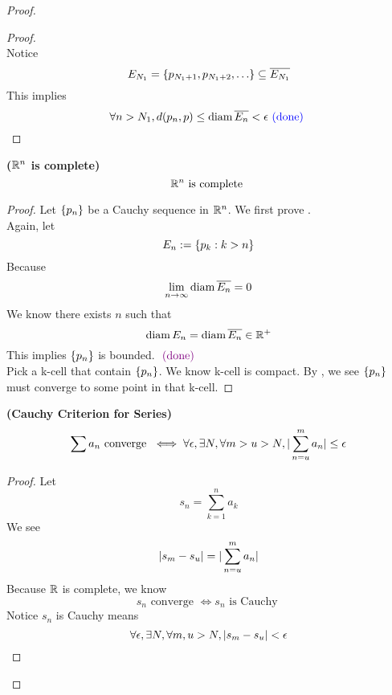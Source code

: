 \documentclass{report}
\begin{document}
\begin{proof}
\begin{proof}
\begin{equation}
\end{equation}
Notice
\begin{equation}
E_{N_1}=\set{p_{N_1+1},p_{N_1+2},\dots }\subseteq \overline{E_{N_1}}
\end{equation}
This implies 
\begin{equation}
\forall n>N_1, d(p_n,p)\leq \text{diam}\, \overline{E_n}<\epsilon \textcolor{blue}{\text{ (done) }}
\end{equation}
\end{proof}
\begin{corollary}
\label{3.9.9}
\textbf{($\mathbb{R}^n$ is complete)}
\begin{equation}
\mathbb{R}^n\text{ is complete }
\end{equation}
\end{corollary}
\begin{proof}
Let $\{ p_n \}$ be a Cauchy sequence in $\mathbb{R}^n$. We first prove .\\

Again, let
\begin{equation}
E_n:=\{ p_k:k>n \}
\end{equation}
Because 
\begin{equation}
\lim_{n\to\infty}\text{diam}\, \overline{E_n}=0
\end{equation}
We know there exists $n$ such that
 \begin{equation}
\text{diam}\, E_n=\text{diam}\, \overline{E_n}\in\mathbb{R}^+
\end{equation}
This implies $\{ p_n \}$ is bounded. $\textcolor{violet}{\text{ (done) }}$\\

Pick a k-cell that contain $\{ p_n \}$. We know k-cell is compact. By , we see $\{ p_n \}$ must converge to some point in that k-cell.
\end{proof}
\begin{corollary}
\label{3.9.10}
\textbf{(Cauchy Criterion for Series)}  
\begin{equation}
\sum a_n\text{ converge }\iff \forall \epsilon ,\exists N, \forall m>u>N, |\sum_{n=u}^m a_n|\leq \epsilon 
\end{equation}
\end{corollary}
\begin{proof}
Let 
 \begin{equation}
s_n=\sum_{k=1}^n a_k
\end{equation}
We see 
\begin{equation}
  |s_m-s_u|=|\sum_{n=u}^m a_n|
\end{equation}
Because $\mathbb{R}$ is complete, we know 
 \begin{equation}
s_n\text{ converge }\iff  s_n\text{ is Cauchy }
\end{equation}
Notice $s_n$ is Cauchy means 
 \begin{equation}
\forall \epsilon, \exists N, \forall m,u>N, |s_m-s_u|<\epsilon 
\end{equation}
\end{proof}

\end{proof}
\end{document}
